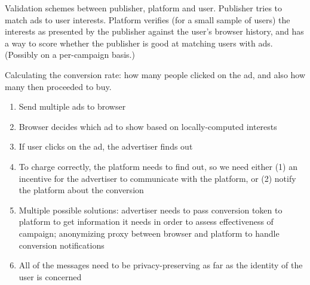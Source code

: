 Validation schemes between publisher, platform and user.  Publisher tries to match ads to user interests.  Platform verifies (for a small sample of users) the interests as presented by the publisher against the user's browser history, and has a way to score whether the publisher is good at matching users with ads.  (Possibly on a per-campaign basis.)

Calculating the conversion rate: how many people clicked on the ad, and also how many then proceeded to buy.

\begin{enumerate}
\item Send multiple ads to browser
\item Browser decides which ad to show based on locally-computed interests
\item If user clicks on the ad, the advertiser finds out
\item To charge correctly, the platform needs to find out, so we need either (1) an incentive for the advertiser to communicate with the platform, or (2) notify the platform about the conversion
\item Multiple possible solutions: advertiser needs to pass conversion token to platform to get information it needs in order to assess effectiveness of campaign; anonymizing proxy between browser and platform to handle conversion notifications
\item All of the messages need to be privacy-preserving as far as the identity of the user is concerned
\end{enumerate}
